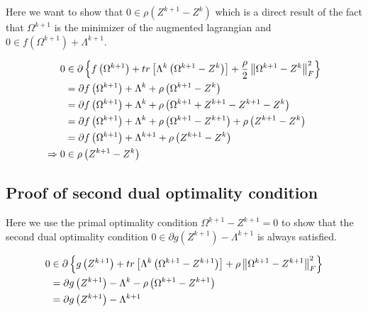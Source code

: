 \documentclass[11pt,]{report}
\theoremstyle{definition}
\theoremstyle{definition}
\theoremstyle{definition}
\theoremstyle{remark}
\begin{document}
Here we want to show that \(0 \in \rho\left(Z^{k + 1} - Z^{k}\right)\) which is a direct result of the fact that \(\Omega^{k + 1}\) is the minimizer of the augmented lagrangian and \(0 \in f\left(\Omega^{k + 1}\right) + \Lambda^{k + 1}\).

\begin{equation}
\begin{split}
  0 &\in \partial \left\{ f\left(\Omega^{k + 1}\right) + tr\left[ \Lambda^{k}\left( \Omega^{k + 1} - Z^{k} \right) \right] + \frac{\rho}{2}\left\| \Omega^{k + 1} - Z^{k} \right\|_{F}^{2} \right\} \\
  &= \partial f\left(\Omega^{k + 1}\right) + \Lambda^{k} + \rho\left(\Omega^{k + 1} - Z^{k}\right) \\
  &= \partial f\left(\Omega^{k + 1}\right) + \Lambda^{k} + \rho\left(\Omega^{k + 1} + Z^{k + 1} - Z^{k + 1} - Z^{k}\right) \\
  &= \partial f\left(\Omega^{k + 1}\right) + \Lambda^{k} + \rho\left(\Omega^{k + 1} - Z^{k + 1}\right) + \rho\left(Z^{k + 1} - Z^{k}\right) \\
  &= \partial f\left(\Omega^{k + 1}\right) + \Lambda^{k + 1} + \rho\left(Z^{k + 1} - Z^{k}\right) \\
  \Rightarrow 0 &\in \rho\left( Z^{k + 1} - Z^{k} \right)
\label{eq:appendixdualresidual}\notag
\end{split}
\end{equation}

\hypertarget{proofdualopt}{%
\subsection{Proof of second dual optimality condition}\label{proofdualopt}}

Here we use the primal optimality condition \(\Omega^{k + 1} - Z^{k + 1} = 0\) to show that the second dual optimality condition \(0 \in \partial g\left(Z^{k + 1}\right) - \Lambda^{k + 1}\) is always satisfied.

\begin{equation}
\begin{split}
  0 &\in \partial \left\{ g\left(Z^{k + 1}\right) + tr\left[ \Lambda^{k}\left( \Omega^{k + 1} - Z^{k + 1} \right) \right] + \rho\left\| \Omega^{k + 1} - Z^{k + 1} \right\|_{F}^{2} \right\} \\
  &= \partial g\left(Z^{k + 1}\right) - \Lambda^{k} - \rho\left(\Omega^{k + 1} - Z^{k + 1}\right) \\
  &= \partial g\left(Z^{k + 1}\right) - \Lambda^{k + 1} \\
\label{eq:appendixdualopt}\notag
\end{split}
\end{equation}
\end{document}
